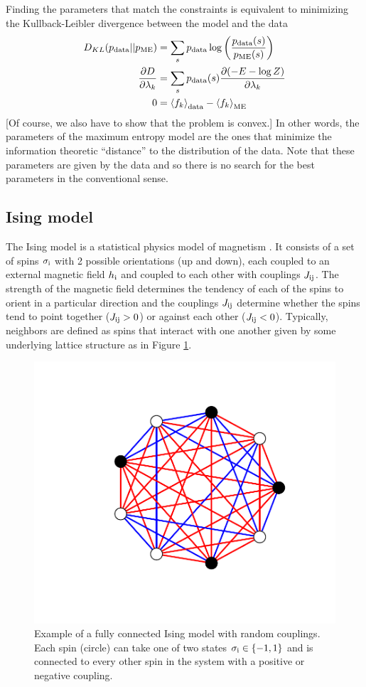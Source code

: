 \documentclass[aps,prl,twocolumn,nofootinbib]{revtex4-1}
\begin{document}
Finding the parameters that match the constraints is equivalent to minimizing the Kullback-Leibler divergence between the model and the data \cite{Cover:2006tl}
\begin{align}
	D_{KL}(p_{\rm data}||p_{\rm ME}) &= \sum_s p_{\rm data} \log\left(\frac{p_{\rm data}(s)}{p_{\rm ME}(s)}\right)\\
	\frac{\partial D}{\partial \lambda_k} &= \sum_s p_{\rm data}(s) \frac{\partial (-E-\log Z)}{\partial \lambda_k}\label{eq:dkl deriv}\\
	0 &= \left<f_k\right>_{\rm data} -\left<f_k\right>_{\rm ME}\label{eq:fk-fk}
\end{align}
[Of course, we also have to show that the problem is convex.] In other words, the parameters of the maximum entropy model are the ones that minimize the information theoretic ``distance'' to the distribution of the data. Note that these parameters are given by the data and so there is no search for the best parameters in the conventional sense.

\subsection{Ising model}
The Ising model is a statistical physics model of magnetism \cite{Ising:1924vf}. It consists of a set of spins $\sigma_{\rm i}$ with 2 possible orientations (up and down), each coupled to an external magnetic field $h_{\rm i}$ and coupled to each other with couplings $J_{\rm ij}$. The strength of the magnetic field determines the tendency of each of the spins to orient in a particular direction and the couplings $J_{\rm ij}$ determine whether the spins tend to point together ($J_{\rm ij}>0$) or against each other ($J_{\rm ij}<0$). Typically, neighbors are defined as spins that interact with one another given by some underlying lattice structure as in Figure \ref{gr:ising}.

\begin{figure}[tbp]\centering
	\includegraphics[width=.85\linewidth,clip,trim={100 70 70 60}]{../images/ising_example}
\caption{Example of a fully connected Ising model with random couplings. Each spin (circle) can take one of two states $\sigma_{\rm i}\in\{-1,1\}$ and is connected to every other spin in the system with a positive or negative coupling.}
\label{gr:ising}
\end{figure}
\end{document}

